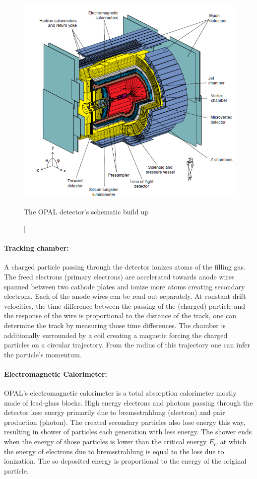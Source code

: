 \begin{figure}[ht]
\centering
\includegraphics[width=1.0\linewidth]{graphics/OPALaufbau}
\caption[[Opal schematic build up]]{The OPAL detector's schematic build up}
\label{fig:OPALaufbau}
\end{figure}

\paragraph{Tracking chamber:}
A charged particle passing through the detector ionizes atoms of the filling gas. The freed electrons (primary electrons) are accelerated towards anode wires spanned between two cathode plates and ionize more atoms creating secondary electrons.
Each of the anode wires can be read out separately. At constant drift velocities, the time difference between the passing of the (charged) particle and the response of the wire is proportional to the distance of the track, one can determine the track by measuring those time differences.
The chamber is additionally surrounded by a coil creating a magnetic forcing the charged particles on a circular trajectory. From the radius of this trajectory one can infer the particle's momentum\cite{staatsex}.

\paragraph{Electromagnetic Calorimeter:}
OPAL's electromagnetic calorimeter is a total absorption calorimeter mostly made of lead-glass blocks\cite{cern}. High energy electrons and photons passing through the detector lose energy primarily due to bremsstrahlung (electron) and pair production (photon). The created secondary particles also lose energy this way, resulting in shower of particles each generation with less energy. The shower ends when the energy of those particles is lower than the critical energy $E_C$ at which the energy of electrons due to bremsstrahlung is equal to the loss due to ionization. The so deposited energy is proportional to the energy of the original particle\cite{muenchen}.

